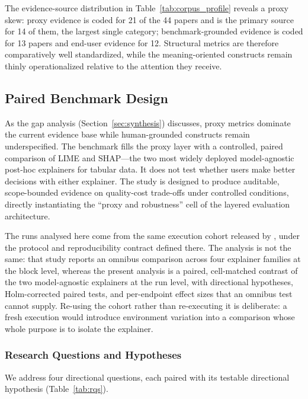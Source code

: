\documentclass[10pt,a4paper,twoside]{article}
\begin{document}
The evidence-source distribution in Table~\ref{tab:corpus_profile}
reveals a proxy skew: proxy evidence is coded for 21 of the 44 papers and is
the primary source for 14 of them, the largest single category; benchmark-grounded
evidence is coded for 13 papers and end-user evidence for 12. Structural metrics
are therefore comparatively well standardized, while the meaning-oriented
constructs remain thinly operationalized relative to the attention they
receive.


\subsection{Paired Benchmark Design}
\label{sec:empirical}

As the gap analysis (Section~\ref{sec:synthesis}) discusses, proxy metrics
dominate the current evidence base while human-grounded constructs remain
underspecified. The benchmark fills the proxy layer with a controlled, paired
comparison of LIME and SHAP---the two most widely deployed
model-agnostic post-hoc explainers for tabular data. It does not test
whether users make better decisions with either explainer. The study is
designed to produce auditable, scope-bounded evidence on quality-cost
trade-offs under controlled conditions, directly instantiating the
``proxy and robustness'' cell of the layered evaluation architecture.

The runs analysed here come from the same execution cohort
released by \citet{herrera2026framework}, under the protocol and
reproducibility contract defined there. The analysis is not the same: that
study reports an omnibus comparison across four explainer families at the
block level, whereas the present analysis is a paired, cell-matched contrast
of the two model-agnostic explainers at the run level, with directional
hypotheses, Holm-corrected paired tests, and per-endpoint effect sizes that
an omnibus test cannot supply. Re-using the cohort rather than re-executing
it is deliberate: a fresh execution would introduce environment variation
into a comparison whose whole purpose is to isolate the explainer.

\subsubsection{Research Questions and Hypotheses}
\label{sec:rqs}

We address four directional questions, each paired with its testable
directional hypothesis (Table~\ref{tab:rqs}).
\end{document}
